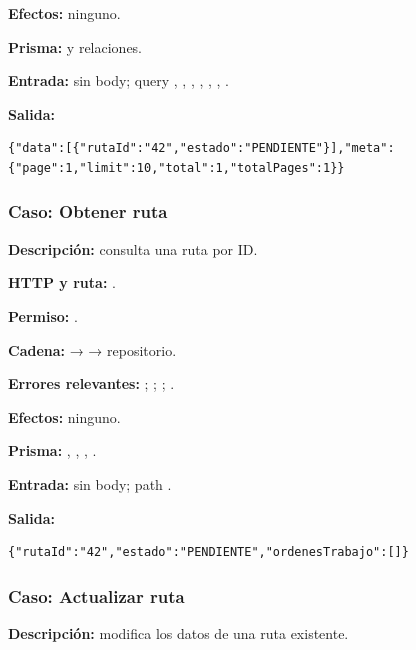 \textbf{Efectos:} ninguno.  

\textbf{Prisma:} \texttt{} y relaciones.  

\textbf{Entrada:} sin body; query \texttt{}, \texttt{}, \texttt{}, \texttt{}, \texttt{}, \texttt{}, \texttt{}.  

\textbf{Salida:}


\begin{lstlisting}
{"data":[{"rutaId":"42","estado":"PENDIENTE"}],"meta":{"page":1,"limit":10,"total":1,"totalPages":1}}
\end{lstlisting}


\subsubsection{Caso: Obtener ruta}


\textbf{Descripción:} consulta una ruta por ID.  

\textbf{HTTP y ruta:} \texttt{}.  

\textbf{Permiso:} \texttt{}.  

\textbf{Cadena:} \texttt{} → \texttt{} → repositorio.  

\textbf{Errores relevantes:} \texttt{}; \texttt{}; \texttt{}; \texttt{}.  

\textbf{Efectos:} ninguno.  

\textbf{Prisma:} \texttt{}, \texttt{}, \texttt{}, \texttt{}.  

\textbf{Entrada:} sin body; path \texttt{}.  

\textbf{Salida:}


\begin{lstlisting}
{"rutaId":"42","estado":"PENDIENTE","ordenesTrabajo":[]}
\end{lstlisting}


\subsubsection{Caso: Actualizar ruta}


\textbf{Descripción:} modifica los datos de una ruta existente.  

